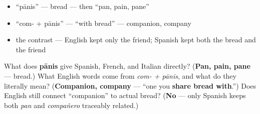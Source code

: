 \begin{itemize}
\raggedright
  \item \textquotedblleft{}pānis\textquotedblright{} — bread — then \textquotedblleft{}pan, pain, pane\textquotedblright{}
  \item \textquotedblleft{}com- + pānis\textquotedblright{} — \textquotedblleft{}with bread\textquotedblright{} — companion, company
  \item the contrast — English kept only the friend; Spanish kept both the bread and the friend
\end{itemize}

\begin{tcolorbox}[breakable,colback=teal!4,colframe=teal!35!black,title={Before you move on}]
What does \textbf{pānis} give Spanish, French, and Italian directly? (\textbf{Pan, pain, pane} — bread.) What English words come from \emph{com- + pānis}, and what do they literally mean? (\textbf{Companion, company} — \textquotedblleft{}one you \textbf{share bread with}.\textquotedblright{}) Does English still connect \textquotedblleft{}companion\textquotedblright{} to actual bread? (\textbf{No} — only Spanish keeps both \emph{pan} and \emph{compañero} traceably related.)
\end{tcolorbox}
